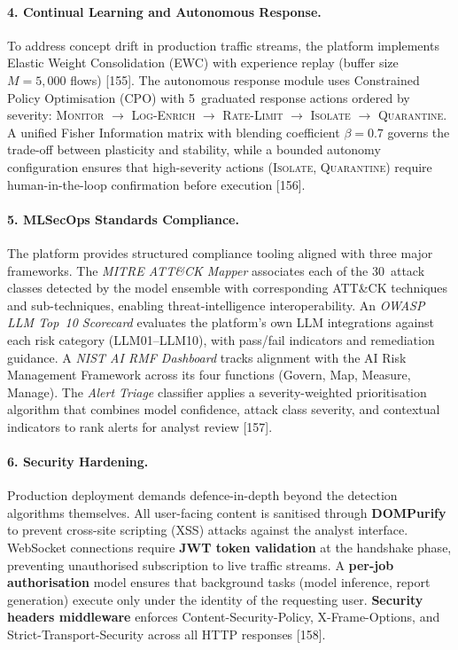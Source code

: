 \documentclass[12pt,a4paper]{article}
\begin{document}
\paragraph{4. Continual Learning and Autonomous Response.}
To address concept drift in production traffic streams, the platform
implements Elastic Weight Consolidation (EWC) with experience replay
(buffer size $M = 5{,}000$ flows) [155].  The autonomous response
module uses Constrained Policy Optimisation (CPO) with 5~graduated
response actions ordered by severity: \textsc{Monitor} $\to$
\textsc{Log-Enrich} $\to$ \textsc{Rate-Limit} $\to$
\textsc{Isolate} $\to$ \textsc{Quarantine}.  A unified Fisher
Information matrix with blending coefficient $\beta = 0.7$ governs
the trade-off between plasticity and stability, while a bounded
autonomy configuration ensures that high-severity actions
(\textsc{Isolate}, \textsc{Quarantine}) require human-in-the-loop
confirmation before execution [156].

\paragraph{5. MLSecOps Standards Compliance.}
The platform provides structured compliance tooling aligned with three
major frameworks.  The \emph{MITRE ATT\&CK Mapper} associates each of
the 30~attack classes detected by the model ensemble with
corresponding ATT\&CK techniques and sub-techniques, enabling
threat-intelligence interoperability.  An \emph{OWASP LLM Top~10
Scorecard} evaluates the platform's own LLM integrations against each
risk category (LLM01--LLM10), with pass/fail indicators and
remediation guidance.  A \emph{NIST AI RMF Dashboard} tracks
alignment with the AI Risk Management Framework across its four
functions (Govern, Map, Measure, Manage).  The \emph{Alert Triage}
classifier applies a severity-weighted prioritisation algorithm that
combines model confidence, attack class severity, and contextual
indicators to rank alerts for analyst review [157].

\paragraph{6. Security Hardening.}
Production deployment demands defence-in-depth beyond the detection
algorithms themselves.  All user-facing content is sanitised through
\textbf{DOMPurify} to prevent cross-site scripting (XSS) attacks
against the analyst interface.  WebSocket connections require
\textbf{JWT token validation} at the handshake phase, preventing
unauthorised subscription to live traffic streams.  A \textbf{per-job
authorisation} model ensures that background tasks (model inference,
report generation) execute only under the identity of the requesting
user.  \textbf{Security headers middleware} enforces
Content-Security-Policy, X-Frame-Options, and
Strict-Transport-Security across all HTTP responses [158].
\end{document}
